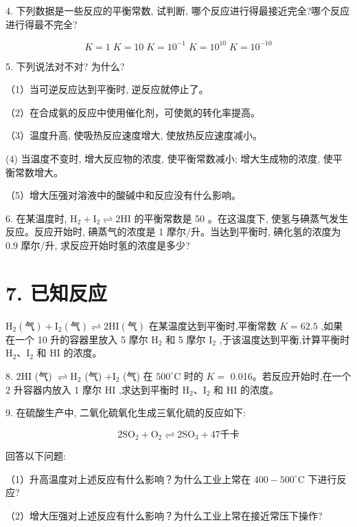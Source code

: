 \documentclass[10pt]{article}
\begin{document}
4. 下列数据是一些反应的平衡常数, 试判断, 哪个反应进行得最接近完全?哪个反应进行得最不完全?

\[
K = 1\;K = {10}\;K = {10}^{-1}\;K = {10}^{10}\;K = {10}^{-{10}}
\]

5. 下列说法对不对? 为什么?

（1）当可逆反应达到平衡时, 逆反应就停止了。

（2）在合成氨的反应中使用催化剂，可使氮的转化率提高。

（3）温度升高, 使吸热反应速度增大, 使放热反应速度减小。

(4) 当温度不变时, 增大反应物的浓度, 使平衡常数减小; 增大生成物的浓度, 使平衡常数增大。

（5）增大压强对溶液中的酸碱中和反应没有什么影响。

6. 在某温度时, \({\mathrm{H}}_{2} + {\mathrm{I}}_{2} \rightleftharpoons 2\mathrm{{HI}}\) 的平衡常数是 50 。在这温度下, 使氢与碘蒸气发生反应。反应开始时, 碘蒸气的浓度是 1 摩尔/升。当达到平衡时, 碘化氢的浓度为 0.9 摩尔/升, 求反应开始时氢的浓度是多少?

\section*{7. 已知反应}

\({\mathrm{H}}_{2}\left( \text{气}\right) + {\mathrm{I}}_{2}\left( \text{气}\right) \rightleftharpoons 2\mathrm{{HI}}\left( \text{气}\right)\) 在某温度达到平衡时,平衡常数 \(K = {62.5}\) ,如果在一个 10 升的容器里放入 5 摩尔 \({\mathrm{H}}_{2}\) 和 5 摩尔 \({\mathrm{I}}_{2}\) ,于该温度达到平衡,计算平衡时 \({\mathrm{H}}_{2}\text{、}{\mathrm{I}}_{2}\) 和 \(\mathrm{{HI}}\) 的浓度。

8. \(2\mathrm{{HI}}\) (气) \(\rightleftharpoons {\mathrm{H}}_{2}\) (气) \(+ {\mathrm{I}}_{2}\) (气) 在 \({500}^{ \circ }\mathrm{C}\) 时的 \(K =\) 0.016。若反应开始时,在一个 2 升容器内放入 1 摩尔 \(\mathrm{{HI}}\) ,求达到平衡时 \({\mathrm{H}}_{2}\text{、}{\mathrm{I}}_{2}\) 和 \(\mathrm{{HI}}\) 的浓度。

9. 在硫酸生产中, 二氧化硫氧化生成三氧化硫的反应如下:

\[
2{\mathrm{{SO}}}_{2} + {\mathrm{O}}_{2} \rightleftharpoons 2{\mathrm{{SO}}}_{3} + {47}\text{千卡}
\]

回答以下问题:

（1）升高温度对上述反应有什么影响？为什么工业上常在 \({400} - {500}^{ \circ }\mathrm{C}\) 下进行反应?

（2）增大压强对上述反应有什么影响？为什么工业上常在接近常压下操作?
\end{document}
